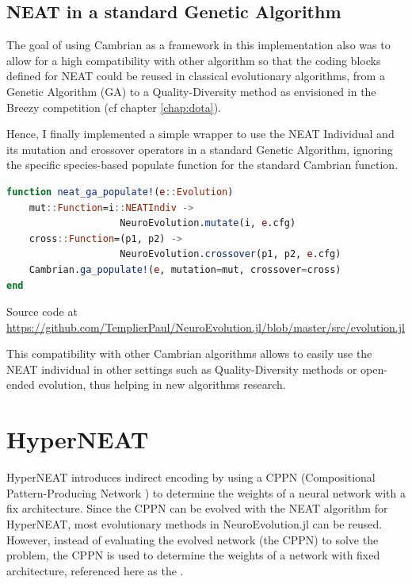 \subsection{NEAT in a standard Genetic Algorithm}

The goal of using Cambrian as a framework in this implementation also was to allow for a high compatibility with other algorithm so that the coding blocks defined for NEAT could be reused in classical evolutionary algorithms, from a Genetic Algorithm (GA) to a Quality-Diversity method as envisioned in the Breezy competition (cf chapter \ref{chap:dota}). 

Hence, I finally implemented a simple wrapper to use the NEAT Individual and its mutation and crossover operators in a standard Genetic Algorithm, ignoring the specific species-based populate function for the standard Cambrian  function.

\begin{minipage}{\linewidth}
\begin{lstlisting}[language=Julia, caption=Genetic Algorithm populate for NEAT]
function neat_ga_populate!(e::Evolution)
    mut::Function=i::NEATIndiv -> 
                    NeuroEvolution.mutate(i, e.cfg)
    cross::Function=(p1, p2) -> 
                    NeuroEvolution.crossover(p1, p2, e.cfg)
    Cambrian.ga_populate!(e, mutation=mut, crossover=cross)
end
\end{lstlisting}
Source code at \url{https://github.com/TemplierPaul/NeuroEvolution.jl/blob/master/src/evolution.jl}\\
\end{minipage}

This compatibility with other Cambrian algorithms allows to easily use the NEAT individual in other settings such as Quality-Diversity methods or open-ended evolution, thus helping in new algorithms research.

\section{HyperNEAT}
HyperNEAT \cite{HyperNEAT} introduces indirect encoding by using a CPPN (Compositional Pattern-Producing Network \cite{CPPN}) to determine the weights of a neural network with a fix architecture. Since the CPPN can be evolved with the NEAT algorithm for HyperNEAT, most evolutionary methods in NeuroEvolution.jl can be reused. \\ 
However, instead of evaluating the evolved network (the CPPN) to solve the problem, the CPPN is used to determine the weights of a network with fixed architecture, referenced here as the . 

